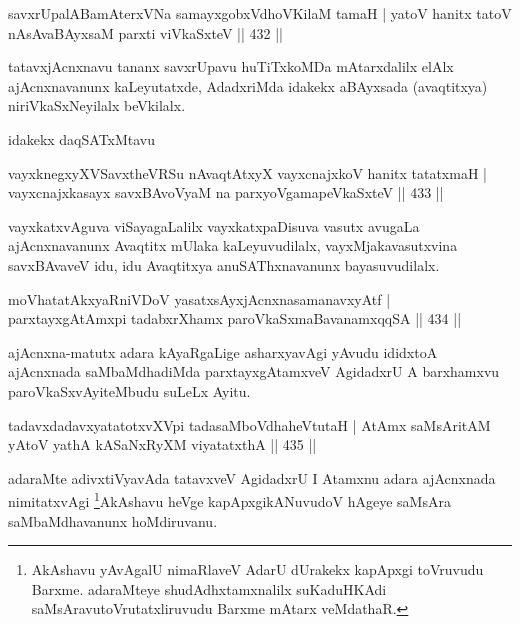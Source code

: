 
\begin{shl}
savxrUpalABamAterxVNa samayxgobxVdhoV\s KilaM tamaH |
yatoV hanitx tatoV nAsAvaBAyxsaM parxti viVkaSxteV \hfill || 432 ||
\end{shl}

\begin{artha}
tatavxjAcnxnavu tananx savxrUpavu huTiTxkoMDa mAtarxdalilx elAlx ajAcnxnavanunx kaLeyutatxde, AdadxriMda idakekx aBAyxsada (avaqtitxya) niriVkaSxNeyilalx beVkilalx.
\end{artha}

\begin{artha}
idakekx daqSATxMtavu
\end{artha}

\begin{shl}
vayxknegxyXVSavxtheVRSu nA\s \s vaqtAtxyX vayxcnajxkoV hanitx tatatxmaH |
vayxcnajxkasayx savxBAvoV\s yaM na parxyoVgamapeVkaSxteV \hfill || 433 ||
\end{shl}

\begin{artha}
vayxkatxvAguva viSayagaLalilx vayxkatxpaDisuva vasutx avugaLa ajAcnxnavanunx Avaqtitx mUlaka kaLeyuvudilalx, vayxMjakavasutxvina savxBAvaveV idu, idu Avaqtitxya anuSAThxnavanunx bayasuvudilalx.
\end{artha}

\begin{shl}
moVhatatAkxyaRniVDoV yasatxsAyxjAcnxnasamanavxyAtf |
parxtayxgAtAmx\s pi tadabxrXhamx paroVkaSxmaBavanamxqqSA \hfill || 434 ||
\end{shl}

\begin{artha}
ajAcnxna-matutx adara kAyaRgaLige asharxyavAgi yAvudu ididxto\break A ajAcnxnada saMbaMdhadiMda parxtayxgAtamxveV AgidadxrU A barxhamxvu paroVkaSxvAyiteMbudu suLeLx Ayitu.
\end{artha}

\begin{shl}
tadavxdadavxyatatotxvXV\s pi tadasaMboVdhaheVtutaH |
AtAmx saMsAritAM yAtoV yathA kASaNxRyXM viyatatxthA \hfill || 435 ||
\end{shl}

\begin{artha}
adaraMte adivxtiVyavAda tatavxveV AgidadxrU I Atamxnu adara ajAcnxnada nimitatxvAgi \footnote{AkAshavu yAvAgalU nimaRlaveV AdarU dUrakekx kapApxgi toVruvudu Barxme. adaraMteye shudAdhxtamxnalilx suKaduHKAdi saMsAravutoVrutatxliruvudu Barxme mAtarx veMdathaR.}AkAshavu heVge kapApxgikANuvudoV hAgeye saMsAra saMbaMdhavanunx hoMdiruvanu.
\end{artha}

